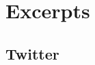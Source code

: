 \chapter{Excerpts}
\label{appendix:excerpts}

\section{Twitter}
\label{appendix:excerpts:twitter}


%
%
%	